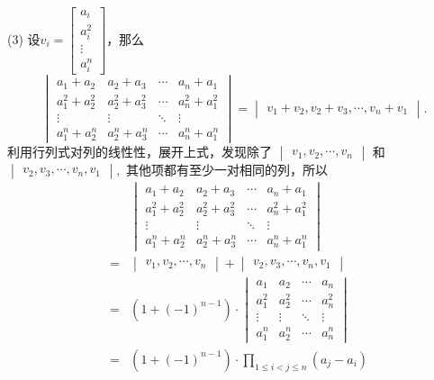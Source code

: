 \documentclass[a4paper]{book}
\begin{document}
\item[(3)] 设$v_i = \begin{bmatrix} a_i \\ a_i^2\\ \vdots\\ a_i^n\end{bmatrix}$，那么
$$\begin{vmatrix} a_1 + a_2 & a_2 + a_3 & \cdots & a_n + a_1 \\ a_1^2 + a_2^2 & a_2^2 + a_3^2 & \cdots & a_n^2 + a_1^2 \\ \vdots & \vdots & \ddots & \vdots \\ a_1^n + a_2^n & a_2^n + a_3^n & \cdots & a_n^n + a_1^n \end{vmatrix} = \begin{vmatrix} v_1 + v_2, v_2 + v_3, \cdots, v_n + v_1 \end{vmatrix}.$$
利用行列式对列的线性性，展开上式，发现除了 $\begin{vmatrix} v_1, v_2, \cdots, v_n\end{vmatrix}$ 和 $\begin{vmatrix} v_2, v_3, \cdots, v_n, v_1\end{vmatrix},$ 其他项都有至少一对相同的列，所以
\begin{eqnarray*}
& & \begin{vmatrix} a_1 + a_2 & a_2 + a_3 & \cdots & a_n + a_1 \\ a_1^2 + a_2^2 & a_2^2 + a_3^2 & \cdots & a_n^2 + a_1^2 \\ \vdots & \vdots & \ddots & \vdots \\ a_1^n + a_2^n & a_2^n + a_3^n & \cdots & a_n^n + a_1^n \end{vmatrix} \\
& = & \begin{vmatrix} v_1, v_2, \cdots, v_n\end{vmatrix} + \begin{vmatrix} v_2, v_3, \cdots, v_n, v_1\end{vmatrix} \\
& = & (1 + (-1)^{n-1}) \cdot \begin{vmatrix} a_1 & a_2& \cdots & a_n \\ a_1^2 & a_2^2 & \cdots & a_n^2 \\ \vdots & \vdots & \ddots & \vdots \\ a_1^n & a_2^n & \cdots & a_n^n \end{vmatrix} \\
& = & (1 + (-1)^{n-1}) \cdot \prod\limits_{1\leqslant i < j \leqslant n}(a_j - a_i)
\end{eqnarray*}
\end{document}
